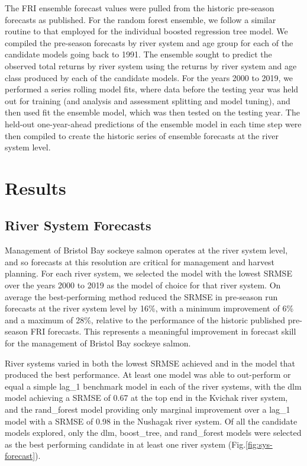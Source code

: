 \documentclass[
]{article}
\begin{document}
The FRI ensemble forecast values were pulled from the historic pre-season forecasts as published. For the random forest ensemble, we follow a similar routine to that employed for the individual boosted regression tree model. We compiled the pre-season forecasts by river system and age group for each of the candidate models going back to 1991. The ensemble sought to predict the observed total returns by river system using the returns by river system and age class produced by each of the candidate models. For the years 2000 to 2019, we performed a series rolling model fits, where data before the testing year was held out for training (and analysis and assessment splitting and model tuning), and then used fit the ensemble model, which was then tested on the testing year. The held-out one-year-ahead predictions of the ensemble model in each time step were then compiled to create the historic series of ensemble forecasts at the river system level.

\hypertarget{results}{%
\section*{Results}\label{results}}

\hypertarget{river-system-forecasts}{%
\subsection*{River System Forecasts}\label{river-system-forecasts}}

Management of Bristol Bay sockeye salmon operates at the river system level, and so forecasts at this resolution are critical for management and harvest planning. For each river system, we selected the model with the lowest SRMSE over the years 2000 to 2019 as the model of choice for that river system. On average the best-performing method reduced the SRMSE in pre-season run forecasts at the river system level by 16\%, with a minimum improvement of 6\% and a maximum of 28\%, relative to the performance of the historic published pre-season FRI forecasts. This represents a meaningful improvement in forecast skill for the management of Bristol Bay sockeye salmon.

River systems varied in both the lowest SRMSE achieved and in the model that produced the best performance. At least one model was able to out-perform or equal a simple lag\_1 benchmark model in each of the river systems, with the dlm model achieving a SRMSE of 0.67 at the top end in the Kvichak river system, and the rand\_forest model providing only marginal improvement over a lag\_1 model with a SRMSE of 0.98 in the Nushagak river system. Of all the candidate models explored, only the dlm, boost\_tree, and rand\_forest models were selected as the best performing candidate in at least one river system (Fig.\ref{fig:sys-forecast}).
\end{document}
